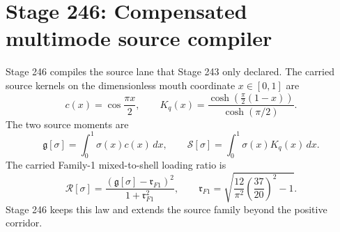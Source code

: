 \section{Stage 246: Compensated multimode source compiler}
\label{sec:app-part08:compensated-multimode-source-compiler}
\label{stage:246}


Stage 246 compiles the source lane that Stage 243 only declared.  The carried source kernels on the dimensionless mouth coordinate \(x\in[0,1]\) are
\begin{equation}
\label{eq:app-part08-stage246-source-kernels}
c(x)=\cos\frac{\pi x}{2},
\qquad
K_q(x)=\frac{\cosh\left(\frac\pi2(1-x)\right)}{\cosh(\pi/2)}.
\end{equation}
The two source moments are
\begin{equation}
\label{eq:app-part08-stage246-source-moments-def}
\mathfrak g[\sigma]=\int_0^1\sigma(x)c(x)\,dx,
\qquad
\mathcal S[\sigma]=\int_0^1\sigma(x)K_q(x)\,dx.
\end{equation}
The carried Family-1 mixed-to-shell loading ratio is
\begin{equation}
\label{eq:app-part08-stage246-rsigma-def}
\mathcal R[\sigma]
=
\frac{(\mathfrak g[\sigma]-\mathfrak r_{F1})^2}{1+\mathfrak r_{F1}^2},
\qquad
\mathfrak r_{F1}=
\sqrt{\frac{12}{\pi^2}\left(\frac{37}{20}\right)^2-1}.
\end{equation}
Stage 246 keeps this law and extends the source family beyond the positive corridor.

